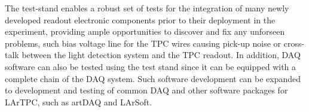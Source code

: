 The test-stand enables a robust set of tests for the integration of many newly developed readout electronic components prior to their deployment in the experiment, providing ample opportunities to discover and fix any unforseen problems, such bias voltage line for the TPC wires causing pick-up noise or cross-talk between the light detection system and the TPC readout.   In addition, DAQ software can also be tested using the test stand since it can be equipped with a complete chain of the DAQ system.  Such software development can be expanded to development and testing of common DAQ and other software packages for LArTPC, such as artDAQ and LArSoft. 





